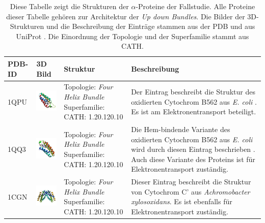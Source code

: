 \documentclass{report}
\begin{document}
\begin{table}


\begin{center}


\caption{Diese Tabelle zeigt die Strukturen der $\alpha$-Proteine der Fallstudie. Alle Proteine dieser Tabelle geh\"oren zur Architektur der \textit{Up down Bundles}. Die Bilder der 3D-Strukturen und die Beschreibung der Eintr\"age stammen aus der PDB und aus UniProt \cite{uniprot}. Die Einordnung der Topologie und der Superfamilie stammt aus CATH. }
\begin{tabular}{ | C{9mm} | C{30mm} | C{29mm} | C{38mm} | }

\hline
PDB-ID & 3D Bild & Struktur & Beschreibung \\ \hline
1QPU  & \includegraphics[width=30mm, trim= -10 -5 -5 -10]{1QPU_asym_r_500.jpg} & Topologie: \newline \textit{Four Helix Bundle} \newline Superfamilie: CATH: 1.20.120.10 & Der Eintrag beschreibt die Struktur des oxidierten Cytochrom B562 aus \textit{E. coli} \cite{1qpu}. Es ist am Elektronentransport beteiligt. \\ \hline
1QQ3  & \includegraphics[width=30mm, trim= -10 -5 -5 -10]{1QQ3_asym_r_500.jpg} & Topologie: \newline \textit{Four Helix Bundle} \newline Superfamilie: CATH: 1.20.120.10  & Die Hem-bindende Variante des oxidierten Cytochrom B562 aus \textit{E. coli} wird durch diesen Eintrag beschrieben \cite{1qq3}. Auch diese Variante des Proteins ist f\"ur Elektronentransport zust\"andig. \\ \hline
1CGN  & \includegraphics[width=30mm, trim= -10 -5 -5 -10]{1CGN_bio_r_500.jpg} & Topologie: \newline \textit{Four Helix Bundle} \newline Superfamilie: CATH: 1.20.120.10  & Dieser Eintrag beschreibt die Struktur von Cytochrom C' \cite{1cgn} aus \textit{Achromobacter xylosoxidans}. Es ist ebenfalls f\"ur Elektronentransport zust\"andig. \\ \hline

\end{tabular}
\end{center}
\end{table}
\end{document}
